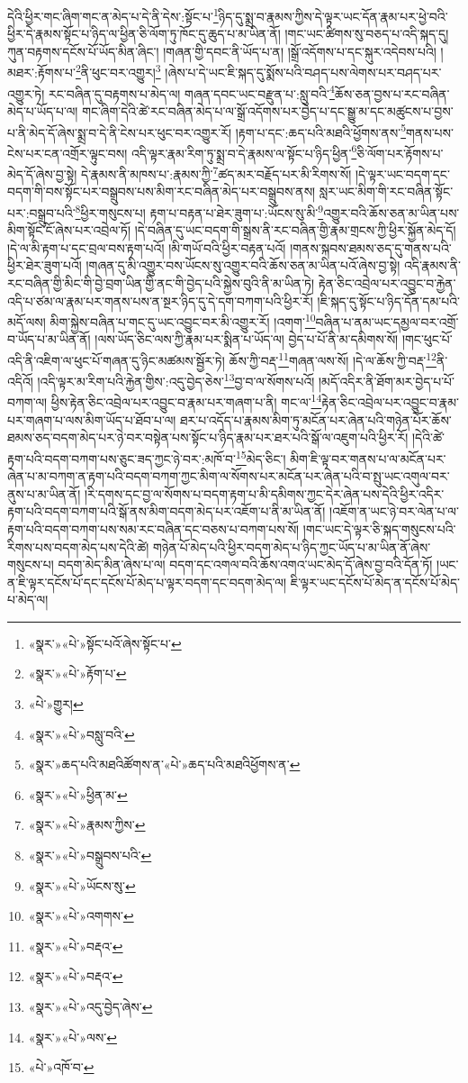 དེའི་ཕྱིར་གང་ཞིག་གང་ན་མེད་པ་དེ་ནི་དེས་:སྟོང་པ་\footnote{«སྣར་»«པེ་»སྟོང་པའོ་ཞེས་སྟོང་པ་}ཉིད་དུ་སྨྲ་བ་རྣམས་ཀྱིས་དེ་ལྟར་ཡང་དོན་རྣམ་པར་ཕྱེ་བའི་ཕྱིར་དེ་རྣམས་སྟོང་པ་ཉིད་ལ་ཕྱིན་ཅི་ལོག་ཏུ་ཁོང་དུ་ཆུད་པ་མ་ཡིན་ནོ། །གང་ཡང་ཚིགས་སུ་བཅད་པ་འདི་སྐད་དུ། ཀུན་བརྟགས་དངོས་པོ་ཡོད་མིན་ཞིང་། །གཞན་གྱི་དབང་ནི་ཡོད་པ་ན། །སྒྲོ་འདོགས་པ་དང་སྐུར་འདེབས་པའི། །མཐར་:རྟོགས་པ་\footnote{«སྣར་»«པེ་»རྟོག་པ་}ནི་ཕུང་བར་འགྱུར།\footnote{«པེ་»གྱུར།} །ཞེས་པ་དེ་ཡང་ཇི་སྐད་དུ་སྨོས་པའི་བཤད་པས་ལེགས་པར་བཤད་པར་འགྱུར་ཏེ། རང་བཞིན་དུ་བརྟགས་པ་མེད་ལ། གཞན་དབང་ཡང་བརྫུན་པ་:སླུ་བའི་\footnote{«སྣར་»«པེ་»བསླུ་བའི་}ཆོས་ཅན་བྱས་པ་རང་བཞིན་མེད་པ་ཡོད་པ་ལ། གང་ཞིག་དེའི་ཚེ་རང་བཞིན་མེད་པ་ལ་སྒྲོ་འདོགས་པར་བྱེད་པ་དང་སྒྱུ་མ་དང་མཚུངས་པ་བྱས་པ་ནི་མེད་དོ་ཞེས་སྨྲ་བ་དེ་ནི་ངེས་པར་ཕུང་བར་འགྱུར་རོ། །རྟག་པ་དང་:ཆད་པའི་མཐའི་ཕྱོགས་ནས་\footnote{«སྣར་»ཆད་པའི་མཐའིཚོགས་ན་«པེ་»ཆད་པའི་མཐའིཕྱོགས་ན་}གནས་པས་ངེས་པར་ངན་འགྲོར་ལྟུང་བས། འདི་ལྟར་རྣམ་རིག་ཏུ་སྨྲ་བ་དེ་རྣམས་ལ་སྟོང་པ་ཉིད་ཕྱིན་\footnote{«སྣར་»«པེ་»ཕྱིན་མ་}ཅི་ལོག་པར་རྟོགས་པ་མེད་དོ་ཞེས་བྱ་སྟེ། དེ་རྣམས་ནི་མཁས་པ་:རྣམས་ཀྱི་\footnote{«སྣར་»«པེ་»རྣམས་ཀྱིས་}ཚད་མར་བརྗོད་པར་མི་རིགས་སོ། །དེ་ལྟར་ཡང་བདག་དང་བདག་གི་བས་སྟོང་པར་བསྒྲུབས་པས་མིག་རང་བཞིན་མེད་པར་བསྒྲུབས་ནས། སླར་ཡང་མིག་གི་རང་བཞིན་སྟོང་པར་:བསྒྲུབ་པའི་\footnote{«སྣར་»«པེ་»བསྒྲུབས་པའི་}ཕྱིར་གསུངས་པ། རྟག་པ་བརྟན་པ་ཐེར་ཟུག་པ་:ཡོངས་སུ་མི་\footnote{«སྣར་»«པེ་»ཡོངས་སུ་}འགྱུར་བའི་ཆོས་ཅན་མ་ཡིན་པས་མིག་སྟོང་ངོ་ཞེས་པར་འབྲེལ་ཏོ། །དེ་བཞིན་དུ་ཡང་བདག་གི་སྒྲས་ནི་རང་བཞིན་གྱི་རྣམ་གྲངས་ཀྱི་ཕྱིར་སྐྱོན་མེད་དོ། །དེ་ལ་མི་རྟག་པ་དང་བྲལ་བས་རྟག་པའོ། །མི་གཡོ་བའི་ཕྱིར་བརྟན་པའོ། །གནས་སྐབས་ཐམས་ཅད་དུ་གནས་པའི་ཕྱིར་ཐེར་ཟུག་པའོ། །གཞན་དུ་མི་འགྱུར་བས་ཡོངས་སུ་འགྱུར་བའི་ཆོས་ཅན་མ་ཡིན་པའོ་ཞེས་བྱ་སྟེ། འདི་རྣམས་ནི་རང་བཞིན་གྱི་མིང་གི་བྱེ་བྲག་ཡིན་གྱི་ནང་གི་བྱེད་པའི་སྐྱེས་བུའི་ནི་མ་ཡིན་ཏེ། རྟེན་ཅིང་འབྲེལ་པར་འབྱུང་བ་རྐྱེན་འདི་པ་ཙམ་ལ་རྣམ་པར་གནས་པས་ན་སྔར་ཉིད་དུ་དེ་དག་བཀག་པའི་ཕྱིར་རོ། །ཇི་སྐད་དུ་སྟོང་པ་ཉིད་དོན་དམ་པའི་མདོ་ལས། མིག་སྐྱེས་བཞིན་པ་གང་དུ་ཡང་འབྱུང་བར་མི་འགྱུར་རོ། །འགག་\footnote{«སྣར་»«པེ་»འགགས་}བཞིན་པ་ནམ་ཡང་དམྱལ་བར་འགྲོ་བ་ཡོད་པ་མ་ཡིན་ནོ། །ལས་ཡོད་ཅིང་ལས་ཀྱི་རྣམ་པར་སྨིན་པ་ཡོད་ལ། བྱེད་པ་པོ་ནི་མ་དམིགས་སོ། །གང་ཕུང་པོ་འདི་ནི་འཇིག་ལ་ཕུང་པོ་གཞན་དུ་ཉིང་མཚམས་སྦྱོར་ཏེ། ཆོས་ཀྱི་བརྡ་\footnote{«སྣར་»«པེ་»བརྡའ་}གཞན་ལས་སོ། །དེ་ལ་ཆོས་ཀྱི་བརྡ་\footnote{«སྣར་»«པེ་»བརྡའ་}ནི་འདིའོ། །འདི་ལྟར་མ་རིག་པའི་རྐྱེན་གྱིས་:འདུ་བྱེད་ཅེས་\footnote{«སྣར་»«པེ་»འདུ་བྱེད་ཞེས་}བྱ་བ་ལ་སོགས་པའོ། །མདོ་འདིར་ནི་ཐོག་མར་བྱེད་པ་པོ་བཀག་ལ། ཕྱིས་རྟེན་ཅིང་འབྲེལ་པར་འབྱུང་བ་རྣམ་པར་གཞག་པ་ནི། གང་ལ་\footnote{«སྣར་»«པེ་»ལས་}རྟེན་ཅིང་འབྲེལ་པར་འབྱུང་བ་རྣམ་པར་གཞག་པ་ལས་མིག་ཡོད་པ་ཐོབ་པ་ལ། ཐར་པ་འདོད་པ་རྣམས་མིག་ཏུ་མངོན་པར་ཞེན་པའི་གཉེན་པོར་ཆོས་ཐམས་ཅད་བདག་མེད་པར་ཉེ་བར་བསྟེན་པས་སྟོང་པ་ཉིད་རྣམ་པར་ཐར་པའི་སྒོ་ལ་འཇུག་པའི་ཕྱིར་རོ། །དེའི་ཚེ་རྟག་པའི་བདག་བཀག་པས་ཅུང་ཟད་ཀྱང་ཉེ་བར་:མཁོ་བ་\footnote{«པེ་»འཁོ་བ་}མེད་ཅིང་། མིག་ཇི་ལྟ་བར་གནས་པ་ལ་མངོན་པར་ཞེན་པ་མ་བཀག་ན་རྟག་པའི་བདག་བཀག་ཀྱང་མིག་ལ་སོགས་པར་མངོན་པར་ཞེན་པའི་བ་སྤུ་ཡང་འགུལ་བར་ནུས་པ་མ་ཡིན་ནོ། །རི་དགས་དང་བྱ་ལ་སོགས་པ་བདག་རྟག་པ་མི་དམིགས་ཀྱང་དེར་ཞེན་པས་དེའི་ཕྱིར་འདིར་རྟག་པའི་བདག་བཀག་པའི་སྒོ་ནས་མིག་བདག་མེད་པར་འཇོག་པ་ནི་མ་ཡིན་ནོ། །འཇོག་ན་ཡང་ཉེ་བར་ལེན་པ་ལ་རྟག་པའི་བདག་བཀག་པས་སམ་རང་བཞིན་དང་བཅས་པ་བཀག་པས་སོ། །གང་ཡང་དེ་ལྟར་ཅི་སྐད་གསུངས་པའི་རིགས་པས་བདག་མེད་པས་དེའི་ཚེ། གཉེན་པོ་མེད་པའི་ཕྱིར་བདག་མེད་པ་ཉིད་ཀྱང་ཡོད་པ་མ་ཡིན་ནོ་ཞེས་གསུངས་པ། བདག་མེད་མིན་ཞེས་པ་ལ། བདག་དང་འགལ་བའི་ཆོས་འགའ་ཡང་མེད་དོ་ཞེས་བྱ་བའི་དོན་ཏོ། །ཡང་ན་ཇི་ལྟར་དངོས་པོ་དང་དངོས་པོ་མེད་པ་ལྟར་བདག་དང་བདག་མེད་ལ། ཇི་ལྟར་ཡང་དངོས་པོ་མེད་ན་དངོས་པོ་མེད་པ་མེད་ལ། 